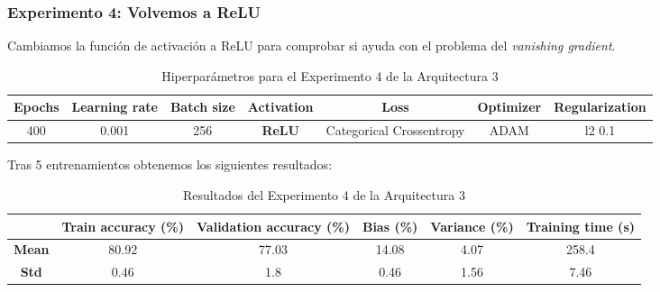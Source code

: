 \documentclass{article}
\begin{document}
		\subsubsection{Experimento 4: Volvemos a ReLU}
		\label{d-s-a3-e4}
			Cambiamos la funci\'on de activaci\'on a ReLU para comprobar si ayuda con el problema del \textit{vanishing gradient}.
			\begin{table}[!h]
				\begin{tabular}{| c | c | c | c | c | c | c |}
					\textbf{Epochs} & \textbf{Learning rate} & \textbf{Batch size} & \textbf{Activation} & \textbf{Loss} & \textbf{Optimizer} & \textbf{Regularization} \\ \hline
					400 & 0.001 & 256 & \textbf{ReLU} & Categorical Crossentropy & ADAM & l2 0.1
				\end{tabular}
				\caption{Hiperpar\'ametros para el Experimento 4 de la Arquitectura 3}
				\label{tab:hip-d-a3-e4}
			\end{table}
			\newpage			
			Tras 5 entrenamientos obtenemos los siguientes resultados:
			\begin{table}[!h]
				\begin{center}
					\begin{tabular}{ c | c | c | c | c | c |}
						\ & \textbf{Train accuracy (\%)} & \textbf{Validation accuracy (\%)} & \textbf{Bias (\%)} & \textbf{Variance (\%)} & \textbf{Training time (s)} \\ \hline
						\textbf{Mean} & 80.92 & 77.03 & 14.08 & 4.07 & 258.4 \\ \hline
						\textbf{Std} & 0.46 & 1.8 & 0.46 & 1.56 & 7.46 \\ \hline
					\end{tabular}
					\caption{Resultados del Experimento 4 de la Arquitectura 3}
					\label{tab:res-d-a3-e4}
				\end{center}
			\end{table}
			
\end{document}
